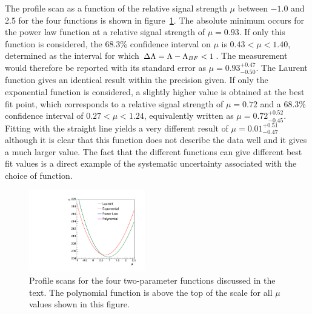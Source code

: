 The profile scan as a function of the relative signal strength $\mu$
between $-1.0$ and 2.5
for the four functions is shown in
figure~\ref{fig:functions:profiles}.
The absolute minimum occurs for the power law function at a relative signal
strength of $\mu = 0.93$. If only this function is considered,
the 68.3\% confidence interval on $\mu$ is
$0.43 < \mu < 1.40 $, determined as the interval for which $\Delta{\rm \ensuremath{\Lambda}} = \Lambda - \Lambda_{BF} < 1$.
The measurement would therefore be reported with its standard error as $\mu=0.93^{+0.47}_{-0.50}$. The Laurent function gives an identical result within the precision given.
If only the exponential function is considered, a slightly higher
\nll value is obtained
at the best fit point, which corresponds to a relative signal strength of $\mu = 0.72$
and a 68.3\% confidence interval of
$0.27 < \mu < 1.24 $, equivalently written as $\mu = 0.72^{+0.52}_{-0.45}$.
Fitting with the straight line yields a very different result of
$\mu = 0.01^{+0.51}_{-0.47}$
although it is clear that this function does not describe the data well and it
gives a much larger \nll value.
The fact that the different functions can give different best fit values
is a direct example of the systematic uncertainty associated
with the choice of function.
%
\begin{figure}[tbp]
\centering
\includegraphics[width=0.45\textwidth]{functions/Profiles.pdf}
\caption{Profile \nll scans for the four two-parameter
functions discussed in the text.
The polynomial function is above the top of the \nll scale for all
$\mu$ values shown in this figure. }
\label{fig:functions:profiles}
\end{figure}

